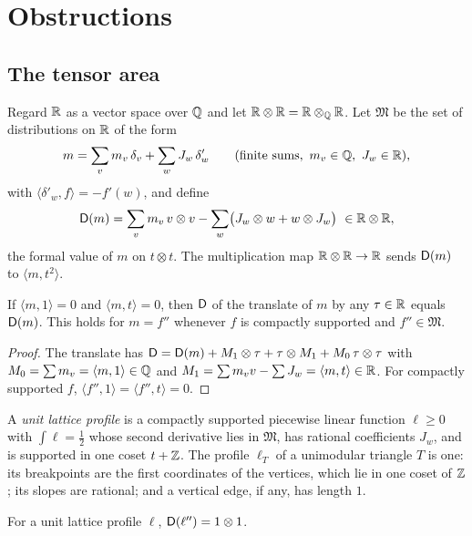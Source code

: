 \documentclass[11pt]{amsart}
\begin{document}
\section{Obstructions}\label{sec:obstructions}

\subsection{The tensor area}\label{sec:tensor}
Regard $\mathbb{R}$ as a vector space over $\mathbb{Q}$ and let $\mathbb{R}\otimes\mathbb{R}=\mathbb{R}\otimes_{\mathbb{Q}}\mathbb{R}$. Let $\mathfrak M$ be the set of
distributions on $\mathbb{R}$ of the form
\[
m=\sum_v m_v\,\delta_v+\sum_w J_w\,\delta'_w\qquad(\text{finite sums},\ m_v\in\mathbb{Q},\ J_w\in\mathbb{R}),
\]
with $\langle\delta'_w,f\rangle=-f'(w)$, and define
\[
\mathsf{D}(m)=\sum_v m_v\,v\otimes v-\sum_w\bigl(J_w\otimes w+w\otimes J_w\bigr)\ \in\mathbb{R}\otimes\mathbb{R},
\]
the formal value of $m$ on $t\otimes t$. The multiplication map $\mathbb{R}\otimes\mathbb{R}\to\mathbb{R}$ sends $\mathsf{D}(m)$ to $\langle
m,t^2\rangle$.

\begin{lemma}\label{lem:D-translate}
If $\langle m,1\rangle=0$ and $\langle m,t\rangle=0$, then $\mathsf{D}$ of the translate of $m$ by any $\tau\in\mathbb{R}$ equals
$\mathsf{D}(m)$. This holds for $m=f''$ whenever $f$ is compactly supported and $f''\in\mathfrak M$.
\end{lemma}

\begin{proof}
The translate has $\mathsf{D}=\mathsf{D}(m)+M_1\otimes\tau+\tau\otimes M_1+M_0\,\tau\otimes\tau$ with $M_0=\sum m_v=\langle m,1\rangle\in\mathbb{Q}$ and
$M_1=\sum m_vv-\sum J_w=\langle m,t\rangle\in\mathbb{R}$. For compactly supported $f$, $\langle f'',1\rangle=\langle
f'',t\rangle=0$.
\end{proof}

A \emph{unit lattice profile} is a compactly supported piecewise linear function $\ell\ge0$ with $\int\ell=\frac12$
whose second derivative lies in $\mathfrak M$, has rational coefficients $J_w$, and is supported in one coset
$t+\mathbb{Z}$. The profile $\ell_T$ of a unimodular triangle $T$ is one: its breakpoints are the first coordinates of the
vertices, which lie in one coset of $\mathbb{Z}$; its slopes are rational; and a vertical edge, if any, has length $1$.

\begin{lemma}\label{lem:D-unit}
For a unit lattice profile $\ell$, $\mathsf{D}(\ell'')=1\otimes1$.
\end{lemma}
\end{document}
